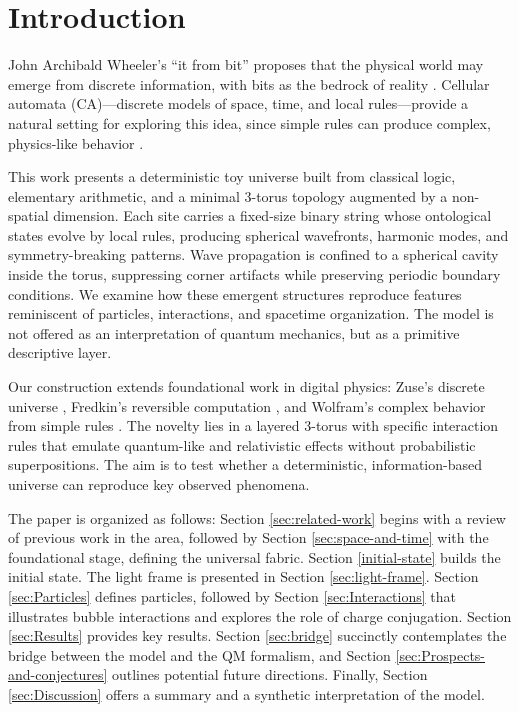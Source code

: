 \documentclass{ijuc}
\begin{document}
\section{Introduction}

John Archibald Wheeler's ``it from bit'' proposes that the physical world may emerge from discrete information, with bits as the bedrock of reality \cite{wheeler}. Cellular automata (CA)---discrete models of space, time, and local rules---provide a natural setting for exploring this idea, since simple rules can produce complex, physics-like behavior \cite{wolfram,zuse,fredkin}.

This work presents a deterministic toy universe built from classical logic, elementary arithmetic, and a minimal 3-torus topology augmented by a non-spatial dimension. Each site carries a fixed-size binary string whose ontological states evolve by local rules, producing spherical wavefronts, harmonic modes, and symmetry-breaking patterns. Wave propagation is confined to a spherical cavity inside the torus, suppressing corner artifacts while preserving periodic boundary conditions. We examine how these emergent structures reproduce features reminiscent of particles, interactions, and spacetime organization. The model is not offered as an interpretation of quantum mechanics, but as a primitive descriptive layer.

Our construction extends foundational work in digital physics: Zuse's discrete universe \cite{zuse}, Fredkin's reversible computation \cite{fredkin}, and Wolfram's complex behavior from simple rules \cite{wolfram}. The novelty lies in a layered 3-torus with specific interaction rules that emulate quantum-like and relativistic effects without probabilistic superpositions. The aim is to test whether a deterministic, information-based universe can reproduce key observed phenomena.

The paper is organized as follows: Section \ref{sec:related-work} begins with a review of previous work in the area, followed by Section \ref{sec:space-and-time} with the foundational stage, defining the universal fabric. 
Section \ref{initial-state} builds the initial state. 
The light frame is presented in Section \ref{sec:light-frame}. 
Section \ref{sec:Particles} defines particles, followed by Section \ref{sec:Interactions} that illustrates bubble interactions and explores the role of charge conjugation. 
Section \ref{sec:Results} provides key results. 
Section \ref{sec:bridge} succinctly contemplates the bridge between the model and the QM formalism, and Section \ref{sec:Prospects-and-conjectures} outlines potential future directions. 
Finally, Section \ref{sec:Discussion} offers a summary and a synthetic interpretation of the model.
\end{document}
